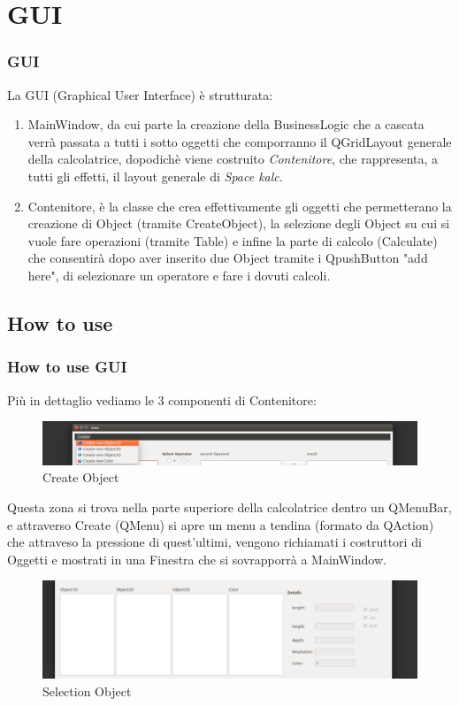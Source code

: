 \documentclass[10pt]{beamer}
\begin{document}
\section{GUI}

\begin{frame}
\frametitle{GUI}
La GUI (Graphical User Interface) è strutturata:
\begin{enumerate}
\item MainWindow, da cui parte la creazione della BusinessLogic che a cascata verrà passata a tutti i sotto oggetti che comporranno il QGridLayout generale della calcolatrice, dopodichè viene costruito \textit{Contenitore}, che rappresenta, a tutti gli effetti, il layout generale di \textit{Space kalc}.

\item Contenitore, è la classe che crea effettivamente gli oggetti che permetterano la creazione di Object (tramite CreateObject), la selezione degli Object su cui si vuole fare operazioni (tramite Table) e infine la parte di calcolo (Calculate) che consentirà dopo aver inserito due Object tramite i QpushButton "add here", di selezionare un operatore e fare i dovuti calcoli.
\end{enumerate}
\end{frame}

\subsection{How to use} 
\begin{frame}
\frametitle{How to use GUI}
Più in dettaglio vediamo le 3 componenti di Contenitore:

   \FloatBarrier
   \begin{figure}[ht]
   \centering
   \includegraphics[scale=0.20]{Creazione.png}
   \caption{Create Object}
\end{figure}
Questa zona si trova nella parte superiore della calcolatrice dentro un QMenuBar, e attraverso Create (QMenu) si apre un menu a tendina (formato da QAction) che attraveso la pressione di quest'ultimi, vengono richiamati i costruttori di Oggetti e mostrati in una Finestra che si sovrapporrà a MainWindow.


   \FloatBarrier
   \begin{figure}[ht]
   \centering
   \includegraphics[scale=0.10]{Selezione.png}
   \caption{Selection Object}
\end{figure}


\end{frame}
\end{document}
